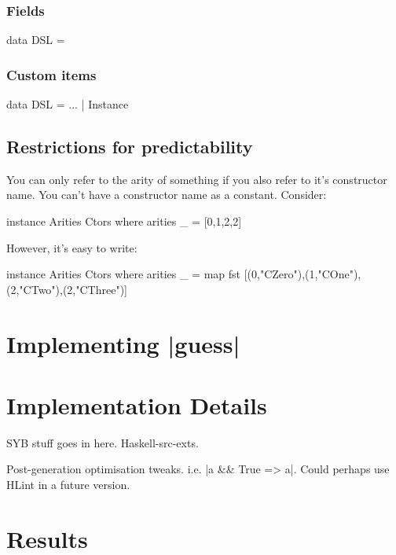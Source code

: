 \documentclass[preprint]{sigplanconf}
\begin{document}
\subsubsection{Fields}

\begin{code}
data DSL = 


\subsubsection{Custom items}

\begin{code}
data DSL = ...
         | Instance 
\end{code}



\subsection{Restrictions for predictability}

You can only refer to the arity of something if you also refer to it's constructor name. You can't have a constructor name as a constant. Consider:

\begin{code}
instance Arities Ctors where
    arities _ = [0,1,2,2]
\end{code}

However, it's easy to write:

\begin{code}
instance Arities Ctors where
    arities _ = map fst [(0,"CZero"),(1,"COne"),(2,"CTwo"),(2,"CThree")]
\end{code}

\section{Implementing |guess|}

\section{Implementation Details}

SYB stuff goes in here. Haskell-src-exts.

Post-generation optimisation tweaks. i.e. |a && True => a|. Could perhaps use HLint in a future version.

\section{Results}


\end{code}
\end{document}
